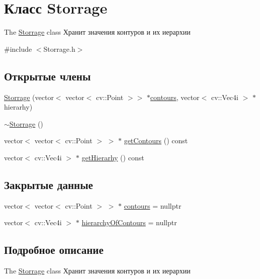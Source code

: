 \hypertarget{class_storrage}{\section{Класс Storrage}
\label{class_storrage}
}


The \hyperlink{class_storrage}{Storrage} class Хранит значения контуров и их иерархии  




{\ttfamily \#include $<$Storrage.\+h$>$}

\subsection*{Открытые члены}
\begin{DoxyCompactItemize}
\item 
\hyperlink{class_storrage_a51a322ff4c3674beaa88417fc437a832}{Storrage} (vector$<$ vector$<$ cv\+::\+Point $>$$>$ $\ast$\hyperlink{class_storrage_a383c9368b9070a2e80ae546b2b403840}{contours}, vector$<$ cv\+::\+Vec4i $>$ $\ast$hierarhy)
\item 
\hyperlink{class_storrage_abe3fcfc281daf37b66a1f56a2d0f27d0}{$\sim$\+Storrage} ()
\item 
vector$<$ vector$<$ cv\+::\+Point $>$ $>$ $\ast$ \hyperlink{class_storrage_a72d26a95d988cde880a765cf6bb909a3}{get\+Contours} () const 
\item 
vector$<$ cv\+::\+Vec4i $>$ $\ast$ \hyperlink{class_storrage_a96e7f72594728b9ffdebd62d390938ec}{get\+Hierarhy} () const 
\end{DoxyCompactItemize}
\subsection*{Закрытые данные}
\begin{DoxyCompactItemize}
\item 
vector$<$ vector$<$ cv\+::\+Point $>$ $>$ $\ast$ \hyperlink{class_storrage_a383c9368b9070a2e80ae546b2b403840}{contours} = nullptr
\item 
vector$<$ cv\+::\+Vec4i $>$ $\ast$ \hyperlink{class_storrage_a07627c89e8ac2b17b05039ffae257511}{hierarchy\+Of\+Contours} = nullptr
\end{DoxyCompactItemize}


\subsection{Подробное описание}
The \hyperlink{class_storrage}{Storrage} class Хранит значения контуров и их иерархии 

